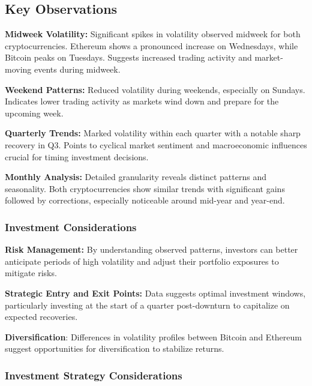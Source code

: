 \documentclass[
]{article}
\begin{document}
\hypertarget{key-observations}{%
\subsection{Key Observations}\label{key-observations}}

\textbf{Midweek Volatility:} Significant spikes in volatility observed
midweek for both cryptocurrencies. Ethereum shows a pronounced increase
on Wednesdays, while Bitcoin peaks on Tuesdays. Suggests increased
trading activity and market-moving events during midweek.

\textbf{Weekend Patterns:} Reduced volatility during weekends,
especially on Sundays. Indicates lower trading activity as markets wind
down and prepare for the upcoming week.

\textbf{Quarterly Trends:} Marked volatility within each quarter with a
notable sharp recovery in Q3. Points to cyclical market sentiment and
macroeconomic influences crucial for timing investment decisions.

\textbf{Monthly Analysis:} Detailed granularity reveals distinct
patterns and seasonality. Both cryptocurrencies show similar trends with
significant gains followed by corrections, especially noticeable around
mid-year and year-end.

\hypertarget{investment-considerations}{%
\subsubsection{Investment
Considerations}\label{investment-considerations}}

\textbf{Risk Management:} By understanding observed patterns, investors
can better anticipate periods of high volatility and adjust their
portfolio exposures to mitigate risks.

\textbf{Strategic Entry and Exit Points:} Data suggests optimal
investment windows, particularly investing at the start of a quarter
post-downturn to capitalize on expected recoveries.

\textbf{Diversification}: Differences in volatility profiles between
Bitcoin and Ethereum suggest opportunities for diversification to
stabilize returns.

\hypertarget{investment-strategy-considerations}{%
\subsubsection{Investment Strategy
Considerations}\label{investment-strategy-considerations}}
\end{document}

